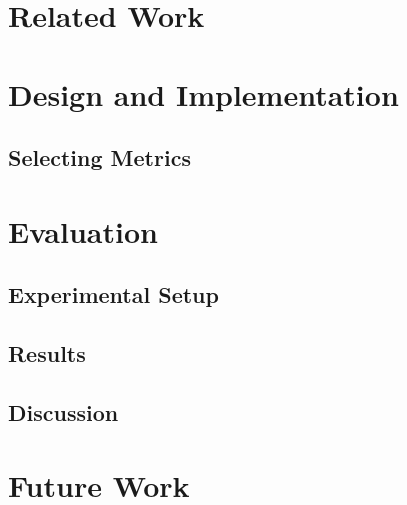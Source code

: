 \documentclass[10pt,twocolumn]{article}
\begin{document}
%

\section{Related Work}


%

\section{Design and Implementation}

\subsection{Selecting Metrics}

%

\section{Evaluation}

\subsection{Experimental Setup}

\subsection{Results}

\subsection{Discussion}


%

\section{Future Work}


%
\end{document}
